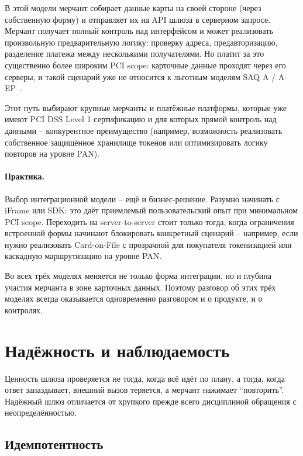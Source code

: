 В этой модели мерчант собирает данные карты на своей стороне
(через собственную форму) и отправляет их на API шлюза
в серверном запросе. Мерчант получает полный контроль над
интерфейсом и может реализовать произвольную предварительную
логику: проверку адреса, предавторизацию, разделение платежа
между несколькими получателями. Но платит за это
существенно более широким PCI scope: карточные данные проходят
через его серверы, и такой сценарий уже не относится к льготным
моделям SAQ A / A-EP~\cite{pci-faq-1291,pci-faq-1293,pci-saq}.

Этот путь выбирают крупные мерчанты и платёжные платформы,
которые уже имеют PCI DSS Level 1 сертификацию и для которых
прямой контроль над данными -- конкурентное преимущество
(например, возможность реализовать собственное защищённое
хранилище токенов или оптимизировать логику повторов
на уровне PAN).

\paragraph{Практика.}
  Выбор интеграционной модели -- ещё и бизнес-решение. Разумно
  начинать с iFrame или SDK: это даёт приемлемый пользовательский
  опыт при минимальном PCI scope. Переходить на server-to-server
  стоит только тогда, когда ограничения встроенной формы начинают
  блокировать конкретный сценарий -- например, если нужно
  реализовать Card-on-File с прозрачной для покупателя токенизацией
  или каскадную маршрутизацию на уровне PAN.


Во всех трёх моделях меняется не только форма интеграции,
но и глубина участия мерчанта в зоне карточных данных. Поэтому
разговор об этих трёх моделях всегда
оказывается одновременно разговором и о продукте, и о контролях.

\section{Надёжность и наблюдаемость}
\label{sec:gw-reliability}

Ценность шлюза проверяется не тогда, когда всё идёт по плану,
а тогда, когда ответ запаздывает, внешний вызов теряется,
а мерчант нажимает \enquote{повторить}. Надёжный шлюз отличается
от хрупкого прежде всего дисциплиной обращения с неопределённостью.

\subsection*{Идемпотентность}

